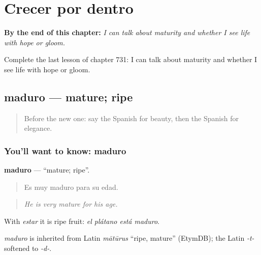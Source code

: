 
\chapter{Crecer por dentro}
\label{ch:es-crecer-por-dentro}

\begin{chapteropening}
\textbf{By the end of this chapter:} \emph{I can talk about maturity and whether I see life with hope or gloom.}

Complete the last lesson of chapter 731: I can talk about maturity and whether I see life with hope or gloom.
\end{chapteropening}

\section[maduro]{maduro — mature; ripe}

\label{lesson:ES-C731-maduro}



\begin{quote}
Before the new one: say the Spanish for beauty, then the Spanish for elegance.
\end{quote}

\subsection*{You'll want to know: maduro}
\textbf{maduro} — \textquotedblleft{}mature; ripe\textquotedblright{}.

\begin{quote}
Es muy maduro para su edad.
\end{quote}

\begin{quote}
\emph{He is very mature for his age.}
\end{quote}

With \emph{estar} it is ripe fruit: \emph{el plátano está maduro}.

\begin{cousinweb}
\emph{maduro} is inherited from Latin \emph{mātūrus} \textquotedblleft{}ripe, mature\textquotedblright{} (EtymDB); the Latin \emph{-t-} softened to \emph{-d-}.
\end{cousinweb}

